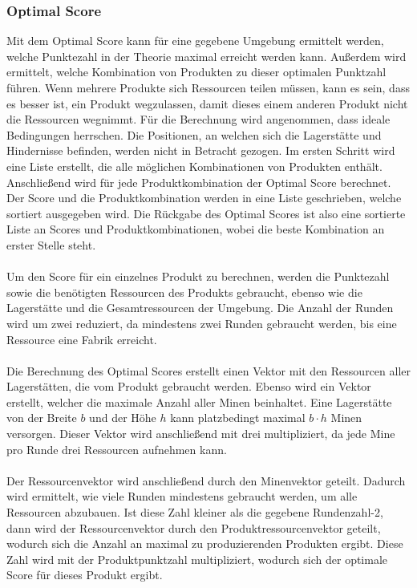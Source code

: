 \subsubsection*{Optimal Score}
Mit dem Optimal Score kann für eine gegebene Umgebung ermittelt werden, welche Punktezahl in der Theorie maximal erreicht werden kann. Außerdem wird ermittelt, welche Kombination von Produkten zu dieser optimalen Punktzahl führen. Wenn mehrere Produkte sich Ressourcen teilen müssen, kann es sein, dass es besser ist, ein Produkt wegzulassen, damit dieses einem anderen Produkt nicht die Ressourcen wegnimmt. 
Für die Berechnung wird angenommen, dass ideale Bedingungen herrschen. Die Positionen, an welchen sich die Lagerstätte und Hindernisse befinden, werden nicht in Betracht gezogen. 
Im ersten Schritt wird eine Liste erstellt, die alle möglichen Kombinationen von Produkten enthält. Anschließend wird für jede Produktkombination der Optimal Score berechnet. Der Score und die Produktkombination werden in eine Liste geschrieben, welche sortiert ausgegeben wird.  Die Rückgabe des Optimal Scores ist also eine sortierte Liste an Scores und Produktkombinationen, wobei die beste Kombination an erster Stelle steht.
\\\\
Um den Score für ein einzelnes Produkt zu berechnen, werden die Punktezahl sowie die benötigten Ressourcen des Produkts gebraucht, ebenso wie die Lagerstätte und die Gesamtressourcen der Umgebung. Die Anzahl der Runden wird um zwei reduziert, da mindestens zwei Runden gebraucht werden, bis eine Ressource eine Fabrik erreicht.
\\\\
Die Berechnung des Optimal Scores erstellt einen Vektor mit den Ressourcen aller Lagerstätten, die vom Produkt gebraucht werden. Ebenso wird ein Vektor erstellt, welcher die maximale Anzahl aller Minen beinhaltet. Eine Lagerstätte von der Breite $b$ und der Höhe $h$ kann platzbedingt maximal $b\cdot h$ Minen versorgen. Dieser Vektor wird anschließend mit drei multipliziert, da jede Mine pro Runde drei Ressourcen aufnehmen kann.
\\\\
Der Ressourcenvektor wird anschließend durch den Minenvektor geteilt. Dadurch wird ermittelt, wie viele Runden mindestens gebraucht werden, um alle Ressourcen abzubauen. Ist diese Zahl kleiner als die gegebene Rundenzahl-2, dann wird der Ressourcenvektor durch den Produktressourcenvektor geteilt, wodurch sich die Anzahl an maximal zu produzierenden Produkten ergibt. Diese Zahl wird mit der Produktpunktzahl multipliziert, wodurch sich der optimale Score für dieses Produkt ergibt.

